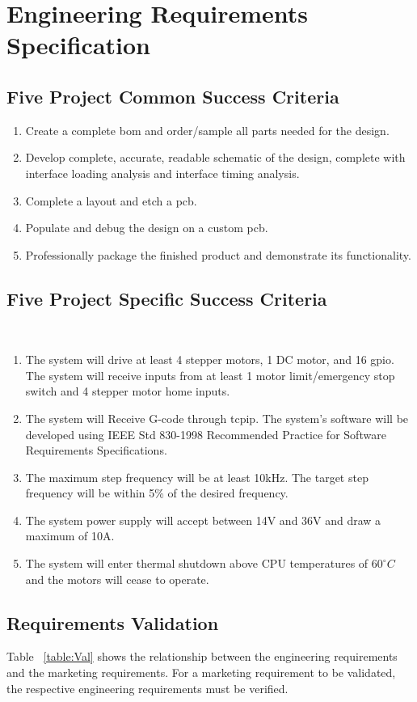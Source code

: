 \chapter{Engineering Requirements Specification}

\section{Five Project Common Success Criteria}
\begin{enumerate}
	\item Create a complete \gls{bom} and order/sample all parts needed for the design.
	\item Develop complete, accurate, readable schematic of the design, complete with interface loading analysis and interface timing analysis. 
	\item Complete a layout and etch a \gls{pcb}.
	\item Populate and debug the design on a custom \gls{pcb}.
	\item Professionally package the finished product and demonstrate its functionality.
\end{enumerate}

\section{Five Project Specific Success Criteria}\
\begin{enumerate}
	\item The system will drive at least 4 stepper motors, 1 DC motor, and 16 \gls{gpio}.
The system will receive inputs from at least 1 motor limit/emergency stop switch and 4 stepper motor home inputs.
	\item The system will Receive G-code through \gls{tcpip}.
The system’s software will be developed using IEEE Std 830-1998 Recommended Practice for Software Requirements Specifications.
	\item The maximum step frequency will be at least 10kHz.
The target step frequency will be within 5\% of the desired frequency.
	\item The system power supply will accept between 14V and 36V and draw a maximum of 10A.
	\item The system will enter thermal shutdown above CPU temperatures of $60^{\circ}C$ and the motors will cease to operate.
\end{enumerate}

\section{Requirements Validation}
Table ~\ref{table:Val} shows the relationship between the engineering requirements and the marketing requirements.
For a marketing requirement to be validated, the respective engineering requirements must be verified.

